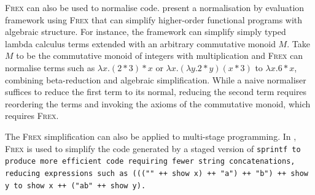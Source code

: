 \textsc{Frex} can also be used to normalise code. \textcite{nbe_frex} present a normalisation by evaluation framework using \textsc{Frex} that can simplify higher-order functional programs with algebraic structure. For instance, the framework can simplify simply typed lambda calculus terms extended with an arbitrary commutative monoid $M$. Take $M$ to be the commutative monoid of integers with multiplication and \textsc{Frex} can normalise terms such as $\lambda x. (2 * 3) * x$ or $\lambda x. (\lambda y. 2 * y) (x * 3)$ to $\lambda x. 6 * x$, combining beta-reduction and algebraic simplification. While a naive normaliser suffices to reduce the first term to its normal, reducing the second term requires reordering the terms and invoking the axioms of the commutative monoid, which requires \textsc{Frex}. 

The \textsc{Frex} simplification can also be applied to multi-stage programming. In \textcite[][Section 4.3]{frex_origin}, \textsc{Frex} is used to simplify the code generated by a staged version of \tt{sprintf} to produce more efficient code requiring fewer string concatenations, reducing expressions such as \tt{((("" ++ show x) ++ "a") ++ "b") ++ show y} to \tt{show x ++ ("ab" ++ show y)}.